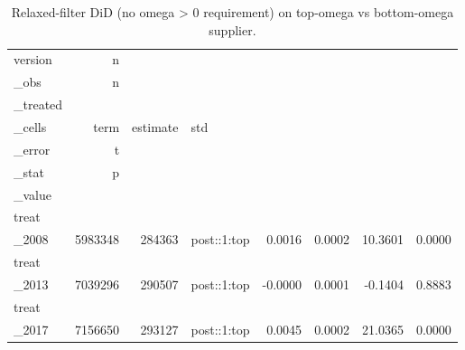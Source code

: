\begin{table}[ht]
\centering
\caption{Relaxed-filter DiD (no omega > 0 requirement) on top-omega vs bottom-omega supplier.} 
\begin{tabular}{lrrlrrrr}
  \toprule
version & n\\_obs & n\\_treated\\_cells & term & estimate & std\\_error & t\\_stat & p\\_value \\ 
  \midrule
treat\\_2008 & 5983348 & 284363 & post::1:top & 0.0016 & 0.0002 & 10.3601 & 0.0000 \\ 
  treat\\_2013 & 7039296 & 290507 & post::1:top & -0.0000 & 0.0001 & -0.1404 & 0.8883 \\ 
  treat\\_2017 & 7156650 & 293127 & post::1:top & 0.0045 & 0.0002 & 21.0365 & 0.0000 \\ 
   \bottomrule
\end{tabular}
\end{table}
